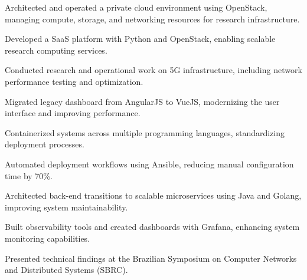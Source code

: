 \documentclass[]{deedy-resume-pdflatex}
\begin{document}
\begin{minipage}[t]{0.65\textwidth}

\vspace{\topsep} %
\begin{tightemize}
\item Architected and operated a private cloud environment using OpenStack, managing compute, storage, and networking resources for research infrastructure.
\item Developed a SaaS platform with Python and OpenStack, enabling scalable research computing services.
\item Conducted research and operational work on 5G infrastructure, including network performance testing and optimization.
\end{tightemize}
\sectionsep


\vspace{\topsep} %
\begin{tightemize}
\item Migrated legacy dashboard from AngularJS to VueJS, modernizing the user interface and improving performance.
\item Containerized systems across multiple programming languages, standardizing deployment processes.
\item Automated deployment workflows using Ansible, reducing manual configuration time by 70\%.
\item Architected back-end transitions to scalable microservices using Java and Golang, improving system maintainability.
\item Built observability tools and created dashboards with Grafana, enhancing system monitoring capabilities.
\item Presented technical findings at the Brazilian Symposium on Computer Networks and Distributed Systems (SBRC).
\end{tightemize}
\sectionsep
\end{minipage} 
\end{document}
